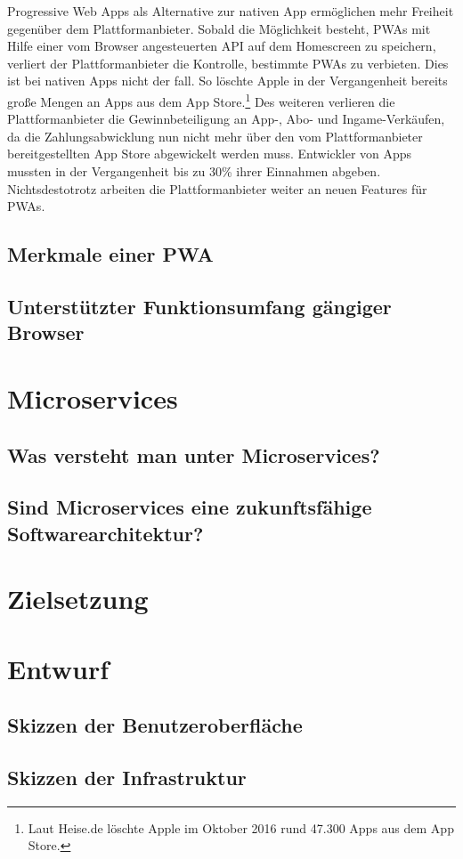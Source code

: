 Progressive Web Apps als Alternative zur nativen App ermöglichen mehr Freiheit gegenüber dem
Plattformanbieter. Sobald die Möglichkeit besteht, PWAs mit Hilfe einer vom Browser angesteuerten API
auf dem Homescreen zu speichern, verliert der Plattformanbieter die Kontrolle,
bestimmte PWAs zu verbieten. Dies ist bei nativen Apps nicht der fall. So löschte Apple in der Vergangenheit
bereits große Mengen an Apps aus dem App Store.\footnote[1]{Laut Heise.de löschte Apple im Oktober 2016 rund 47.300 Apps aus dem App Store.\cite{HeiseAppleLoeschtApps}} 
Des weiteren verlieren die Plattformanbieter die Gewinnbeteiligung an App-, Abo- und Ingame-Verkäufen,
da die Zahlungsabwicklung nun nicht mehr über den vom Plattformanbieter bereitgestellten App Store
abgewickelt werden muss. Entwickler von Apps mussten in der Vergangenheit bis zu 30\% 
ihrer Einnahmen abgeben. \cite{WinFutureEigenerAppStore} Nichtsdestotrotz arbeiten
die Plattformanbieter weiter an neuen Features für PWAs.


\subsection{Merkmale einer PWA}

\subsection{Unterstützter Funktionsumfang gängiger Browser}

\section{Microservices}

\subsection{Was versteht man unter Microservices?}

\subsection{Sind Microservices eine zukunftsfähige Softwarearchitektur?}

\section{Zielsetzung}

\section{Entwurf}

\subsection{Skizzen der Benutzeroberfläche}
\subsection{Skizzen der Infrastruktur}

